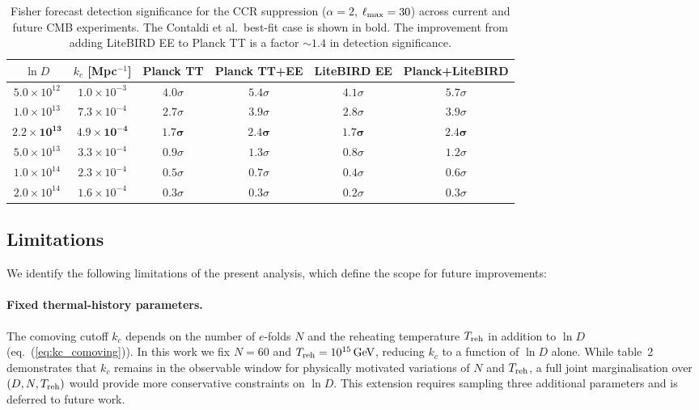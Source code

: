 \begin{table}[t]
  \centering
  \begin{tabular}{cccccc}
    \hline\hline
    $\ln D$ & $k_c$ [Mpc$^{-1}$] & Planck TT & Planck TT+EE
      & LiteBIRD EE & Planck+LiteBIRD \\
    \hline
    $5.0\times 10^{12}$ & $1.0\times 10^{-3}$ & $4.0\sigma$ & $5.4\sigma$
      & $4.1\sigma$ & $5.7\sigma$ \\
    $1.0\times 10^{13}$ & $7.3\times 10^{-4}$ & $2.7\sigma$ & $3.9\sigma$
      & $2.8\sigma$ & $3.9\sigma$ \\
    $\mathbf{2.2\times 10^{13}}$ & $\mathbf{4.9\times 10^{-4}}$
      & $\mathbf{1.7\sigma}$ & $\mathbf{2.4\sigma}$
      & $\mathbf{1.7\sigma}$ & $\mathbf{2.4\sigma}$ \\
    $5.0\times 10^{13}$ & $3.3\times 10^{-4}$ & $0.9\sigma$ & $1.3\sigma$
      & $0.8\sigma$ & $1.2\sigma$ \\
    $1.0\times 10^{14}$ & $2.3\times 10^{-4}$ & $0.5\sigma$ & $0.7\sigma$
      & $0.4\sigma$ & $0.6\sigma$ \\
    $2.0\times 10^{14}$ & $1.6\times 10^{-4}$ & $0.3\sigma$ & $0.3\sigma$
      & $0.2\sigma$ & $0.3\sigma$ \\
    \hline\hline
  \end{tabular}
  \caption{Fisher forecast detection significance for the CCR suppression
    ($\alpha = 2$, $\ell_{\rm max} = 30$) across current and future CMB
    experiments. The Contaldi et al.\ best-fit case is shown in bold.
    The improvement from adding LiteBIRD EE to Planck TT is a factor
    $\sim 1.4$ in detection significance.}
  \label{tab:fisher_results}
\end{table}

\clearpage
\subsection{Limitations}
\label{subsec:limitations}

We identify the following limitations of the present analysis, which
define the scope for future improvements:

\paragraph{Fixed thermal-history parameters.}
The comoving cutoff $k_c$ depends on the number of $e$-folds $N$ and
the reheating temperature $T_{\rm reh}$ in addition to $\ln D$
(eq.~(\ref{eq:kc_comoving})).  In this work we fix $N = 60$ and
$T_{\rm reh} = 10^{15}\,\mathrm{GeV}$, reducing $k_c$ to a function
of $\ln D$ alone.  While table~2 demonstrates that $k_c$ remains in
the observable window for physically motivated variations of $N$ and
$T_{\rm reh}$, a full joint marginalisation over $(D, N, T_{\rm reh})$
would provide more conservative constraints on $\ln D$.  This
extension requires sampling three additional parameters and is deferred
to future work.

